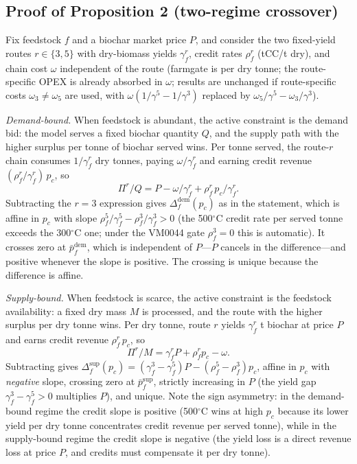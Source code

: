 \subsection{Proof of Proposition 2 (two-regime crossover)}

Fix feedstock $f$ and a biochar market price $P$, and consider the two
fixed-yield routes $r\in\{3,5\}$ with dry-biomass yields $\gamma^{r}_f$,
credit rates $\rho^{r}_f$ (tCC/t dry), and chain cost $\omega$ independent of
the route (farmgate is per dry tonne; the route-specific OPEX is already
absorbed in $\omega$; results are unchanged if route-specific costs
$\omega_3\ne\omega_5$ are used, with $\omega(1/\gamma^5-1/\gamma^3)$ replaced by
$\omega_5/\gamma^5-\omega_3/\gamma^3$).

\emph{Demand-bound.} When feedstock is abundant, the active constraint is the
demand bid: the model serves a fixed biochar quantity $Q$, and the supply path
with the higher surplus per tonne of biochar served wins. Per tonne served, the
route-$r$ chain consumes $1/\gamma^{r}_f$ dry tonnes, paying
$\omega/\gamma^{r}_f$ and earning credit revenue
$(\rho^{r}_f/\gamma^{r}_f)\,p_c$, so
\begin{equation}
\Pi^{r}/Q = P - \omega/\gamma^{r}_f + \rho^{r}_f\,p_c/\gamma^{r}_f .
\end{equation}
Subtracting the $r=3$ expression gives
$\Delta^{\mathrm{dem}}_f(p_c)$ as in the statement, which is affine in $p_c$
with slope $\rho^{5}_f/\gamma^{5}_f-\rho^{3}_f/\gamma^{3}_f>0$ (the 500$^\circ$C
credit rate per served tonne exceeds the 300$^\circ$C one; under the VM0044
gate $\rho^3_f=0$ this is automatic). It crosses zero at
$\bar{p}^{\mathrm{dem}}_f$, which is independent of $P$---$P$ cancels in the
difference---and positive whenever the slope is positive. The crossing is
unique because the difference is affine.

\emph{Supply-bound.} When feedstock is scarce, the active constraint is the
feedstock availability: a fixed dry mass $M$ is processed, and the route with
the higher surplus per dry tonne wins. Per dry tonne, route $r$ yields
$\gamma^{r}_f$ t biochar at price $P$ and earns credit revenue
$\rho^{r}_f\,p_c$, so
\begin{equation}
\Pi^{r}/M = \gamma^{r}_f P + \rho^{r}_f p_c - \omega .
\end{equation}
Subtracting gives
$\Delta^{\mathrm{sup}}_f(p_c)=(\gamma^{3}_f-\gamma^{5}_f)P-(\rho^{5}_f-\rho^{3}_f)p_c$,
affine in $p_c$ with \emph{negative} slope, crossing zero at
$\bar{p}^{\mathrm{sup}}_f$, strictly increasing in $P$ (the yield gap
$\gamma^3_f-\gamma^5_f>0$ multiplies $P$), and unique. Note the sign
asymmetry: in the demand-bound regime the credit slope is positive (500$^\circ$C
wins at high $p_c$ because its lower yield per dry tonne concentrates credit
revenue per served tonne), while in the supply-bound regime the credit slope
is negative (the yield loss is a direct revenue loss at price $P$, and credits
must compensate it per dry tonne).

